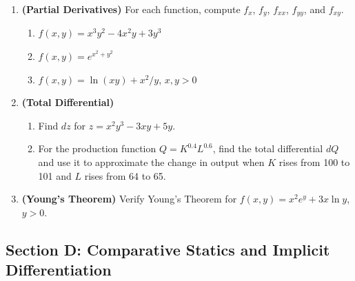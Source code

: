\documentclass[12pt, a4paper]{article}
\theoremstyle{definition}
\begin{document}
\begin{enumerate}[label=\textbf{C\arabic*.}, leftmargin=2.5em]

\item \textbf{(Partial Derivatives)}
For each function, compute $f_x$, $f_y$, $f_{xx}$, $f_{yy}$, and $f_{xy}$.
\begin{enumerate}[label=(\alph*)]
  \item $f(x,y) = x^3y^2 - 4x^2y + 3y^3$
  \item $f(x,y) = e^{x^2+y^2}$
  \item $f(x,y) = \ln(xy) + x^2/y$, $x,y>0$
\end{enumerate}

\item \textbf{(Total Differential)}
\begin{enumerate}[label=(\alph*)]
  \item Find $dz$ for $z = x^2y^3 - 3xy + 5y$.
  \item For the production function $Q = K^{0.4}L^{0.6}$, find the total
    differential $dQ$ and use it to approximate the change in output when $K$
    rises from 100 to 101 and $L$ rises from 64 to 65.
\end{enumerate}

\item \textbf{(Young's Theorem)}
Verify Young's Theorem for $f(x,y) = x^2 e^y + 3x\ln y$, $y>0$.

\end{enumerate}

\subsection{Section D: Comparative Statics and Implicit Differentiation}
\end{document}

